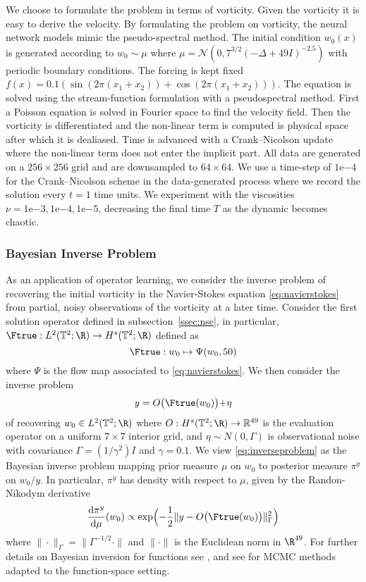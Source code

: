 We choose to formulate the problem in terms of vorticity. Given the vorticity it is easy to derive the velocity. By formulating the problem on vorticity, the neural network models mimic the pseudo-spectral method. 
The initial condition $ w_0(x)$ is generated according to 
\(w_0 \sim \mu\) where \(\mu = \mathcal{N}(0,7^{3/2}(-\Delta + 49I)^{-2.5})\) with periodic boundary conditions. The forcing is kept fixed $f(x) = 0.1(\sin(2\pi(x_1+x_2)) + \cos(2\pi(x_1 + x_2)))$. The equation is solved using the stream-function formulation with a pseudospectral method. First a Poisson equation is solved in Fourier space to find the velocity field. Then the vorticity is differentiated and the non-linear term is computed is physical space after which it is dealiased. Time is advanced with a Crank–Nicolson update where the non-linear term does not enter the implicit part. 
All data are generated on a $256 \times 256$ grid and are downsampled to $64 \times 64$. We use a time-step of $1\mathrm{e}{-4}$ for the Crank–Nicolson scheme in the data-generated process where we record the solution every $t=1$ time units. 
We experiment with the viscosities $\nu = 1\mathrm{e}{-3}, 1\mathrm{e}{-4}, 1\mathrm{e}{-5}$, decreasing the final time $T$ as the dynamic becomes chaotic.
\fi

\subsubsection{Bayesian Inverse Problem}
\label{sec:problem:bayesian}

As an application of operator learning, we consider the inverse problem of recovering the initial vorticity in the Navier-Stokes equation \eqref{eq:navierstokes} from partial, noisy observations of the vorticity at a later time. Consider the first solution operator defined in subsection~\ref{ssec:nse}, in particular, \(\Ftrue : L^2(\mathbb{T}^2;\R) \to H^s(\mathbb{T}^2;\R)\) defined as
\[\Ftrue : w_0 \mapsto \Psi(w_0, 50)\]
where \(\Psi\) is the flow map associated to \eqref{eq:navierstokes}. We then consider the inverse problem 
\begin{equation}
    \label{eq:inverseproblem}
    y = O \bigl ( \Ftrue(w_0) \bigl ) + \eta 
\end{equation}
of recovering \(w_0 \in L^2(\mathbb{T}^2;\R)\) where \(O : H^s(\mathbb{T}^2;\R) \to \mathbb{R}^{49}\) is the evaluation operator on a uniform \(7 \times 7\) interior grid, and \(\eta \sim N(0,\Gamma)\) is observational noise with covariance \(\Gamma = (1/\gamma^2)I\) and \(\gamma = 0.1\). We view \eqref{eq:inverseproblem} as the Bayesian inverse problem mapping prior measure \(\mu\) on $w_0$ to posterior measure \(\pi^y\) on $w_0/y.$
In particular, \(\pi^y\) has density with respect to \(\mu\), given by the Randon-Nikodym derivative
\[\frac{\text{d} \pi^y}{\text{d} \mu} (w_0) \propto \text{exp} \Bigl( -\frac12\|y - O \bigl ( \Ftrue(w_0) \bigl ) \|_{\Gamma}^2 \Bigr)\]
where \(\|\cdot\|_{\Gamma} = \|\Gamma^{-1/2} \cdot \|\) and \(\|\cdot\|\) is the Euclidean norm in \(\R^{49}\). For further details on Bayesian inversion for functions see \citep{cotter2009bayesian,stuart_2010}, and see \citep{Cotter_2013} for MCMC methods adapted
to the function-space setting.

